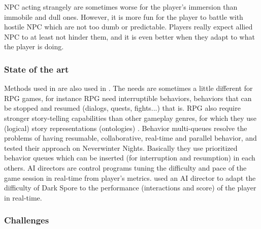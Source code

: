 NPC acting strangely are sometimes worse for the player's immersion than immobile and dull ones. However, it is more fun for the player to battle with hostile NPC which are not too dumb or predictable. Players really expect allied NPC to at least not hinder them, and it is even better when they adapt to what the player is doing. %

\subsubsection{State of the art}

Methods used in  are also used in . The needs are sometimes a little different for RPG games, for instance RPG need interruptible behaviors, behaviors that can be stopped and resumed (dialogs, quests, fights...) that is. RPG also require stronger story-telling capabilities than other gameplay genres, for which they use (logical) story representations (ontologies) \citep{kline2009,riedl11}. Behavior multi-queues \citep{Cutumisu09} resolve the problems of having resumable, collaborative, real-time and parallel behavior, and tested their approach on Neverwinter Nights. Basically they use prioritized behavior queues which can be inserted (for interruption and resumption) in each others. AI directors are control programs tuning the difficulty and pace of the game session in real-time from player's metrics. \citet{kline2011} used an AI director to adapt the difficulty of Dark Spore to the performance (interactions and score) of the player in real-time.

\subsubsection{Challenges}


